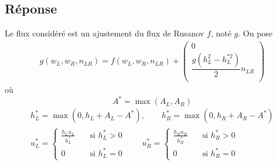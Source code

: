 \documentclass[
	french,
	11pt, %
]{fphw}
\newcommand{\myvec}[3]{\begin{pmatrix} #1  \\ #2 \\ #3 \end{pmatrix}}   %
\begin{document}
\subsection*{Réponse} 
Le flux considéré est un ajustement du flux de Rusanov $f$, noté $g$. On pose
\begin{align*}
	g(w_L,w_R, n_{LR}) = f(w_L,w_R, n_{LR}) + \myvec{0}{\dfrac{g(h_L^2 - h_L^{*2})}{2}n_{LR}}{}
\end{align*}
où $$A^* = \max(A_L, A_R)$$
\begin{align*}
	h_L^* = \max(0,h_L+A_L-A^*), \qquad h_R^* = \max(0,h_R+A_R-A^*) \\
	u_L^* = \begin{cases}
		\frac{h_Lu_L}{h_L^*} &\quad \text{si } h_L^*>0 \\
		0 &\quad \text{si } h_L^*=0
	\end{cases}	\qquad 	u_R^* = \begin{cases}
		\frac{h_Ru_R}{h_R^*} &\quad \text{si } h_R^*>0 \\
		0 &\quad \text{si } h_R^*=0
	\end{cases}
\end{align*}
\end{document}
